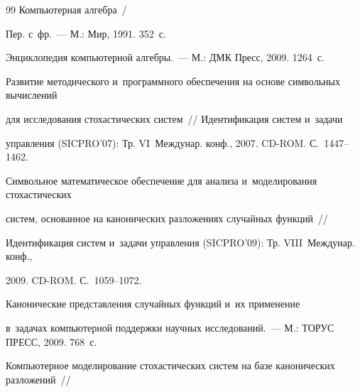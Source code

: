 {{\begin{thebibliography}{99}
 Компьютерная алгебра~/

Пер. с~фр.~--- М.: Мир, 1991. 352~с.







 Энциклопедия компьютерной алгебры.~--- М.: ДМК Пресс, 2009. 1264~с.





Развитие методического и~программного обеспечения на основе символьных вычислений 

для исследования стохастических систем~/\!\!/ Идентификация систем и~задачи 

управления (SICPRO'07): Тр. VI~Междунар. конф., 2007. CD-ROM. С.~1447--1462.





Символьное математическое обеспечение для анализа и~моделирования стохастических 

систем, основанное на канонических разложениях случайных функций~/\!\!/ 

Идентификация систем и~задачи управ\-ле\-ния (SICPRO'09): Тр. VIII~Междунар. конф., 

2009. CD-ROM. С.~1059--1072.




 Канонические представления случайных функций и~их применение 

в~задачах компьютерной поддержки научных исследований.~--- М.: ТОРУС ПРЕСС, 2009. 768~с.





Компьютерное моделирование стохастических сис\-тем на базе канонических разложений~/\!\!/ 


\end{thebibliography}}}
